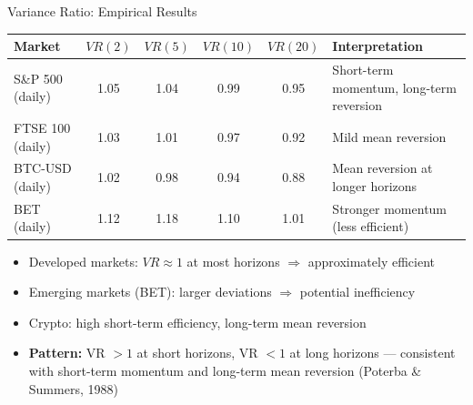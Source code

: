 \documentclass[9pt, aspectratio=169, t]{beamer}
\theoremstyle{definition}
\newenvironment{cminipage}[1]{%
    \par\noindent\hfill\begin{minipage}{#1}\ignorespaces
}{%
    \end{minipage}\hfill\null\par
}
\begin{document}
\begin{frame}{Variance Ratio: Empirical Results}
\begin{cminipage}{0.95\textwidth}
\small
\renewcommand{\arraystretch}{1.2}
\begin{center}
\begin{tabular}{lccccl}
\toprule
\textbf{Market} & $VR(2)$ & $VR(5)$ & $VR(10)$ & $VR(20)$ & \textbf{Interpretation} \\
\midrule
S\&P 500 (daily) & 1.05 & 1.04 & 0.99 & 0.95 & Short-term momentum, long-term reversion \\
FTSE 100 (daily) & 1.03 & 1.01 & 0.97 & 0.92 & Mild mean reversion \\
BTC-USD (daily) & 1.02 & 0.98 & 0.94 & 0.88 & Mean reversion at longer horizons \\
BET (daily) & 1.12 & 1.18 & 1.10 & 1.01 & Stronger momentum (less efficient) \\
\bottomrule
\end{tabular}
\end{center}

\vspace{0.2cm}
\begin{itemize}\setlength{\itemsep}{0pt}
    \item Developed markets: $VR \approx 1$ at most horizons $\Rightarrow$ approximately efficient
    \item Emerging markets (BET): larger deviations $\Rightarrow$ potential inefficiency
    \item Crypto: high short-term efficiency, long-term mean reversion
    \item \textbf{Pattern:} VR $> 1$ at short horizons, VR $< 1$ at long horizons --- consistent with short-term momentum and long-term mean reversion (Poterba \& Summers, 1988)
\end{itemize}
\end{cminipage}
\end{frame}
\end{document}
